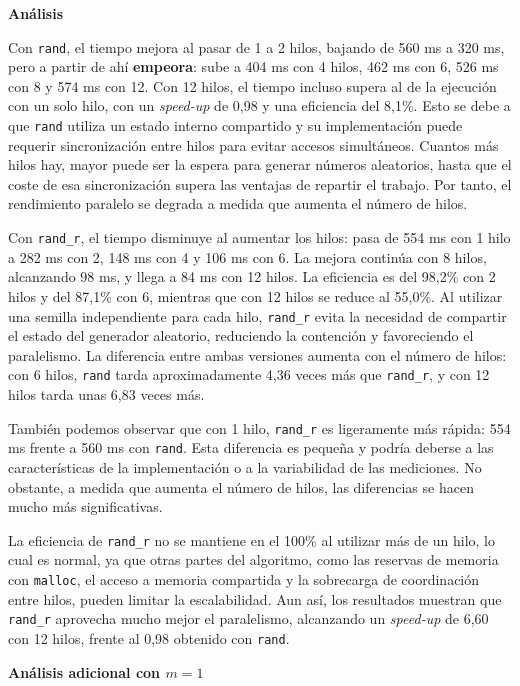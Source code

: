 \documentclass[12pt]{article}
\begin{document}
\begin{enumerate}
\medskip
\noindent\textbf{Análisis}\par
\smallskip
 Con \texttt{rand}, el tiempo mejora al pasar de 1 a 2 hilos, bajando de 560 ms a 320 ms, pero a partir de ahí \textbf{empeora}: sube a 404 ms con 4 hilos, 462 ms con 6, 526 ms con 8 y 574 ms con 12. Con 12 hilos, el tiempo incluso supera al de la ejecución con un solo hilo, con un \textit{speed-up} de 0,98 y una eficiencia del 8,1\%. Esto se debe a que \texttt{rand} utiliza un estado interno compartido y su implementación puede requerir sincronización entre hilos para evitar accesos simultáneos. Cuantos más hilos hay, mayor puede ser la espera para generar números aleatorios, hasta que el coste de esa sincronización supera las ventajas de repartir el trabajo. Por tanto, el rendimiento paralelo se degrada a medida que aumenta el número de hilos.

Con \texttt{rand\_r}, el tiempo disminuye al aumentar los hilos: pasa de 554 ms con 1 hilo a 282 ms con 2, 148 ms con 4 y 106 ms con 6. La mejora continúa con 8 hilos, alcanzando 98 ms, y llega a 84 ms con 12 hilos. La eficiencia es del 98,2\% con 2 hilos y del 87,1\% con 6, mientras que con 12 hilos se reduce al 55,0\%. Al utilizar una semilla independiente para cada hilo, \texttt{rand\_r} evita la necesidad de compartir el estado del generador aleatorio, reduciendo la contención y favoreciendo el paralelismo. La diferencia entre ambas versiones aumenta con el número de hilos: con 6 hilos, \texttt{rand} tarda aproximadamente 4,36 veces más que \texttt{rand\_r}, y con 12 hilos tarda unas 6,83 veces más.

También podemos observar que con 1 hilo, \texttt{rand\_r} es ligeramente más rápida: 554 ms frente a 560 ms con \texttt{rand}. Esta diferencia es pequeña y podría deberse a las características de la implementación o a la variabilidad de las mediciones. No obstante, a medida que aumenta el número de hilos, las diferencias se hacen mucho más significativas.

La eficiencia de \texttt{rand\_r} no se mantiene en el 100\% al utilizar más de un hilo, lo cual es normal, ya que otras partes del algoritmo, como las reservas de memoria con \texttt{malloc}, el acceso a memoria compartida y la sobrecarga de coordinación entre hilos, pueden limitar la escalabilidad. Aun así, los resultados muestran que \texttt{rand\_r} aprovecha mucho mejor el paralelismo, alcanzando un \textit{speed-up} de 6,60 con 12 hilos, frente al 0,98 obtenido con \texttt{rand}.


\medskip
\noindent\textbf{Análisis adicional con $m=1$}\par
\smallskip


\end{enumerate}
\end{document}
